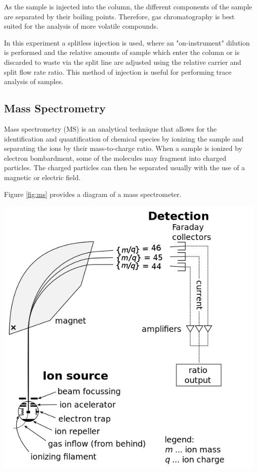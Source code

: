 \documentclass{article}
\newenvironment{nscenter}
    {\parskip=0pt\par\nopagebreak\centering}
    {\par\noindent\ignorespacesafterend}
\begin{document}
\begin{multicols}{2}
{As the sample is injected into the column, the different components of the
sample are separated by their boiling points. Therefore, gas chromatography
is best suited for the analysis of more volatile compounds.

In this experiment a splitless injection is used, where an "on-instrument"
dilution is performed and the relative amounts of sample which enter the
column or is discarded to waste via the split line are adjusted using the
relative carrier and split flow rate ratio. \cite{injection} 
This method of injection is useful for performing trace analysis of samples.

\subsection*{Mass Spectrometry}
Mass spectrometry (MS) is an analytical technique that allows for the
identification and quantification of chemical species by ionizing the sample
and separating the ions by their mass-to-charge ratio. 
When a sample is ionized by electron bombardment, some of the molecules may
fragment into charged particles.
The charged particles can then be separated usually with the use of a magnetic or electric
field. \cite{ms_msu}

Figure \ref{fig:ms} provides a diagram of a mass spectrometer.

\begin{nscenter}
    \includegraphics[scale=0.22]{ms.png}
    \label{fig:ms}
\end{nscenter}

}
\end{multicols}
\end{document}

